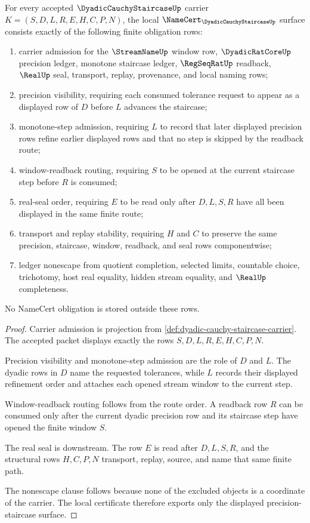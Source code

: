 \begin{theorem}
\label{thm:dyadic-cauchy-staircase-namecert-obligations}
For every accepted $\DyadicCauchyStaircaseUp$ carrier $K=(S,D,L,R,E,H,C,P,N)$, the local $\NameCert_{\DyadicCauchyStaircaseUp}$ surface consists exactly of the following finite obligation rows:
\begin{enumerate}
\item carrier admission for the $\StreamNameUp$ window row, $\DyadicRatCoreUp$ precision ledger, monotone staircase ledger, $\RegSeqRatUp$ readback, $\RealUp$ seal, transport, replay, provenance, and local naming rows;
\item precision visibility, requiring each consumed tolerance request to appear as a displayed row of $D$ before $L$ advances the staircase;
\item monotone-step admission, requiring $L$ to record that later displayed precision rows refine earlier displayed rows and that no step is skipped by the readback route;
\item window-readback routing, requiring $S$ to be opened at the current staircase step before $R$ is consumed;
\item real-seal order, requiring $E$ to be read only after $D,L,S,R$ have all been displayed in the same finite route;
\item transport and replay stability, requiring $H$ and $C$ to preserve the same precision, staircase, window, readback, and seal rows componentwise;
\item ledger nonescape from quotient completion, selected limits, countable choice, trichotomy, host real equality, hidden stream equality, and $\RealUp$ completeness.
\end{enumerate}
No NameCert obligation is stored outside these rows.
\end{theorem}
\begin{proof}
Carrier admission is projection from \autoref{def:dyadic-cauchy-staircase-carrier}. The accepted packet displays exactly the rows $S,D,L,R,E,H,C,P,N$.

Precision visibility and monotone-step admission are the role of $D$ and $L$. The dyadic rows in $D$ name the requested tolerances, while $L$ records their displayed refinement order and attaches each opened stream window to the current step.

Window-readback routing follows from the route order. A readback row $R$ can be consumed only after the current dyadic precision row and its staircase step have opened the finite window $S$.

The real seal is downstream. The row $E$ is read after $D,L,S,R$, and the structural rows $H,C,P,N$ transport, replay, source, and name that same finite path.

The nonescape clause follows because none of the excluded objects is a coordinate of the carrier. The local certificate therefore exports only the displayed precision-staircase surface.
\end{proof}

